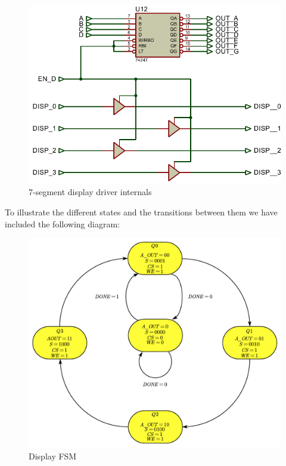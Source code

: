 \begin{figure}[H]
    \centering
    \includegraphics[scale = 0.8]{Graphics/STATE_FSM + DISPLAY/DISP_ENABLE_INT.PDF}
    \caption{7-segment display driver internals}
    \label{fig:DISP_ENABLE_INT}
\end{figure}

\clearpage

To illustrate the different states and the transitions between them we have included the following diagram:\medskip

\begin{figure}[H]
    \centering
    \includegraphics[scale = 0.55]{Graphics/STATE_FSM + DISPLAY/DISPLAY_FSM.pdf}
    \caption{Display FSM}
    \label{fig:DISPLAY_FSM_FSM}
\end{figure}

